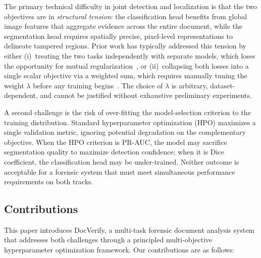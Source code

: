 The primary technical difficulty in joint detection and localization is that the
two objectives are in \emph{structural tension}: the classification head benefits
from global image features that aggregate evidence across the entire document,
while the segmentation head requires spatially precise, pixel-level representations
to delineate tampered regions. Prior work has typically addressed this tension by
either (i)~treating the two tasks independently with separate models, which loses
the opportunity for mutual regularization~\cite{trufor2023}, or (ii)~collapsing
both losses into a single scalar objective via a weighted sum, which requires
manually tuning the weight $\lambda$ before any training
begins~\cite{caruana1997multitask, kendall2018multi}. The choice of $\lambda$ is
arbitrary, dataset-dependent, and cannot be justified without exhaustive
preliminary experiments.

A second challenge is the risk of over-fitting the model-selection criterion to the
training distribution. Standard hyperparameter optimization (HPO) maximizes a
single validation metric, ignoring potential degradation on the complementary
objective. When the HPO criterion is PR-AUC, the model may sacrifice segmentation
quality to maximize detection confidence; when it is Dice coefficient, the
classification head may be under-trained. Neither outcome is acceptable for a
forensic system that must meet simultaneous performance requirements on both tracks.

\subsection*{Contributions}

This paper introduces DocVerify, a multi-task forensic document analysis
system that addresses both challenges through a principled multi-objective
hyperparameter optimization framework. Our contributions are as follows:

